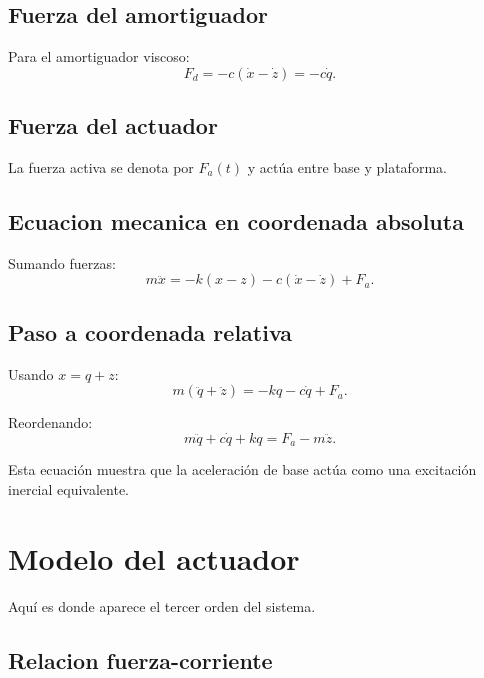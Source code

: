 \documentclass[11pt]{article}
\begin{document}
\subsection{Fuerza del amortiguador}

Para el amortiguador viscoso:
\begin{equation}
F_d = -c(\dot x-\dot z) = -c\dot q.
\label{eq:damper}
\end{equation}

\subsection{Fuerza del actuador}

La fuerza activa se denota por $F_a(t)$ y act\'ua entre base y plataforma.

\subsection{Ecuacion mecanica en coordenada absoluta}

Sumando fuerzas:
\begin{equation}
m\ddot x = -k(x-z)-c(\dot x-\dot z)+F_a.
\label{eq:mech_abs}
\end{equation}

\subsection{Paso a coordenada relativa}

Usando $x=q+z$:
\begin{equation}
m(\ddot q+\ddot z) = -kq-c\dot q+F_a.
\end{equation}

Reordenando:
\begin{equation}
m\ddot q + c\dot q + kq = F_a - m\ddot z.
\label{eq:mech_rel}
\end{equation}

Esta ecuaci\'on muestra que la aceleraci\'on de base act\'ua como una excitaci\'on inercial equivalente.

\section{Modelo del actuador}

Aqu\'i es donde aparece el tercer orden del sistema.

\subsection{Relacion fuerza-corriente}
\end{document}
